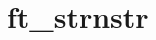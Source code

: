 \chapter{ft\+\_\+strnstr}
\hypertarget{md_Documentation_2ft__strnstr}{}\label{md_Documentation_2ft__strnstr}
